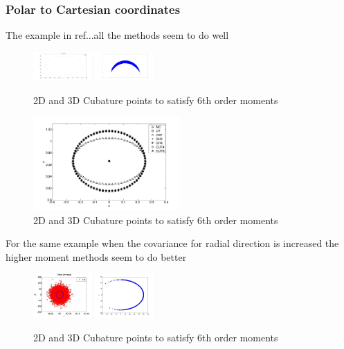 \documentclass[letterpaper, 10 pt, conference]{ieeeconf}  %
\begin{document}
\subsubsection{Polar to Cartesian coordinates}
The example in ref...all the methods seem to do well
   \begin{figure}[thpb]
      \centering
      \includegraphics[width=0.2\textwidth]{polartocart5}
      \includegraphics[width=0.2\textwidth]{polartocart4}
      \caption{2D and 3D Cubature points to satisfy 6th order moments}
      \label{fig:23d4m1}
   \end{figure}
      \begin{figure}[thpb]
      \centering
      \includegraphics[width=0.5\textwidth]{polartocart3}
      \caption{2D and 3D Cubature points to satisfy 6th order moments}
      \label{fig:23d4m1}
   \end{figure}  
For the same example when the covariance for radial direction is increased the higher moment methods seem to do better
   
   \begin{figure}[thpb]
      \centering
      \includegraphics[width=0.2\textwidth]{polar}
      \includegraphics[width=0.2\textwidth]{polartocart2}
      \caption{2D and 3D Cubature points to satisfy 6th order moments}
      \label{fig:23d4m1}
   \end{figure} 
   
\end{document}
